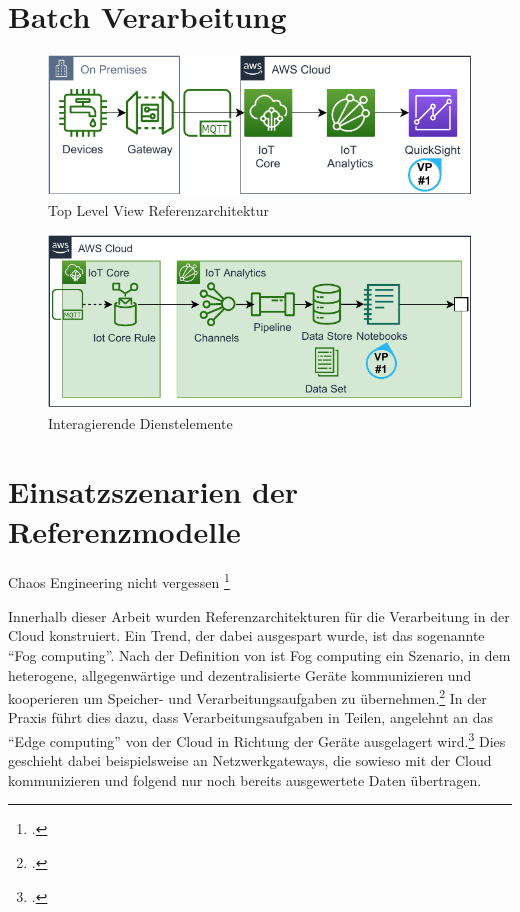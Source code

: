 \section{Batch Verarbeitung}



\begin{figure}[H]
\centering
\includegraphics[width=\textwidth]{graphics/DB-RA-Overview.pdf}
\caption{Top Level View Referenzarchitektur}
\label{abb:TopLevelDBRA}
\end{figure}



\begin{figure}[H]
\centering
\includegraphics[width=\textwidth]{graphics/DB-RA-Elements.pdf}
\caption{Interagierende Dienstelemente}
\label{abb:ElementeDBRA}
\end{figure}

\section{Einsatzszenarien der Referenzmodelle}


Chaos Engineering nicht vergessen \footcite[Vgl.][]{Augsten.2020}

Innerhalb dieser Arbeit wurden Referenzarchitekturen für die Verarbeitung in der Cloud konstruiert. Ein Trend, der dabei ausgespart wurde, ist das sogenannte \enquote{Fog computing}. Nach der Definition von \citeauthor{Vaquero.2014} ist Fog computing ein Szenario, in dem heterogene, allgegenwärtige und dezentralisierte Geräte kommunizieren und kooperieren um Speicher- und Verarbeitungsaufgaben zu übernehmen.\footcite[Vgl.][30\psq]{Vaquero.2014} In der Praxis führt dies dazu, dass Verarbeitungsaufgaben in Teilen, angelehnt an das \enquote{Edge computing} von der Cloud in Richtung der Geräte ausgelagert wird.\footcite[Vgl.][]{Bonomi.2012} Dies geschieht dabei beispielsweise an Netzwerkgateways, die sowieso mit der Cloud kommunizieren und folgend nur noch bereits ausgewertete Daten übertragen.